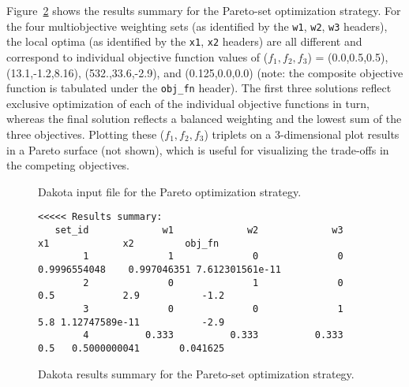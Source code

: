 Figure~\ref{strat:figure05} shows the results summary for the
Pareto-set optimization strategy. For the four multiobjective
weighting sets (as identified by the \texttt{w1}, \texttt{w2},
\texttt{w3} headers), the local optima (as identified by the
\texttt{x1}, \texttt{x2} headers) are all different and correspond to
individual objective function values of ($f_1,f_2,f_3$) =
(0.0,0.5,0.5), (13.1,-1.2,8.16), (532.,33.6,-2.9), and (0.125,0.0,0.0)
(note: the composite objective function is tabulated under the
\texttt{obj\_fn} header).  The first three solutions reflect exclusive
optimization of each of the individual objective functions in turn,
whereas the final solution reflects a balanced weighting and the
lowest sum of the three objectives.  Plotting these ($f_1,f_2,f_3$)
triplets on a 3-dimensional plot results in a Pareto surface (not
shown), which is useful for visualizing the trade-offs in the
competing objectives.

\begin{figure}
  \centering
  \begin{bigbox}
    \begin{small}
    \end{small}
  \end{bigbox}
  \caption{Dakota input file for the Pareto optimization strategy.}
  \label{strat:figure04}
\end{figure}

\begin{figure}
\centering
\begin{bigbox}
\begin{scriptsize}
\begin{verbatim}
<<<<< Results summary:
   set_id             w1             w2             w3             x1             x2         obj_fn
        1              1              0              0   0.9996554048    0.997046351 7.612301561e-11
        2              0              1              0            0.5            2.9           -1.2
        3              0              0              1            5.8 1.12747589e-11           -2.9
        4          0.333          0.333          0.333            0.5   0.5000000041       0.041625
\end{verbatim}
\end{scriptsize}
\end{bigbox}
\caption{Dakota results summary for the Pareto-set optimization
  strategy.}
\label{strat:figure05}
\end{figure}

